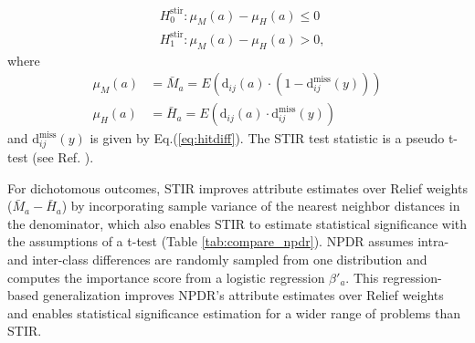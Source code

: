 \documentclass{bioinfo}
\begin{document}

\begin{equation}
\begin{aligned}
    & H^{\text{stir}}_0: \mu_M(a) - \mu_H(a) \le 0 \\
    & H^{\text{stir}}_1: \mu_M(a) - \mu_H(a) > 0,
\end{aligned}
\end{equation}  
where
\begin{equation}
\begin{aligned}
    \mu_M(a) & = \bar{M}_a = E \left( \text{d}_{ij}(a) \cdot \left( 1-\text{d}^{\text{miss}}_{ij}(y) \right) \right) \\
    \mu_H(a) & = \bar{H}_a = E \left( \text{d}_{ij}(a) \cdot        \text{d}^{\text{miss}}_{ij}(y)           \right)
\end{aligned}
\end{equation}  
and $\text{d}^{\text{miss}}_{ij}(y)$ is given by Eq.(\ref{eq:hitdiff}). The STIR test statistic is a pseudo t-test (see Ref. \citep{stir}).

For dichotomous outcomes, STIR improves attribute estimates over Relief weights ($\bar{M}_a - \bar{H}_a$) by incorporating sample variance of the nearest neighbor distances in the denominator, which also enables STIR to estimate statistical significance with the assumptions of a t-test (Table \ref{tab:compare_npdr}).
NPDR assumes intra- and inter-class differences are randomly sampled from one distribution and computes the importance score from a logistic regression $\beta'_a$.
This regression-based generalization improves NPDR's attribute estimates over Relief weights and enables statistical significance estimation for a wider range of problems than STIR.
\end{document}
